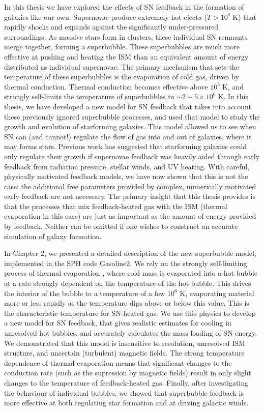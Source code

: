 In this thesis we have explored the effects of SN feedback in the formation of
galaxies like our own.  Supernovae produce extremely hot ejecta
($T>10^8\;\mathrm{K}$) that rapidly shocks and expands against the significantly
under-pressured surroundings.  As massive stars form in clusters, these
individual SN remnants merge together, forming a superbubble.  These
superbubbles are much more effective at pushing and heating the ISM than an
equivalent amount of energy distributed as individual supernovae.  The primary
mechanism that sets the temperature of these superbubbles is the evaporation of
cold gas, driven by thermal conduction.  Thermal conduction becomes effective
above $10^5\;\mathrm{K}$, and strongly self-limits the temperature of
superbubbles to $\sim2-5\times10^6\;\mathrm{K}$.  In this thesis, we have
developed a new model for SN feedback that takes into account these previously
ignored superbubble processes, and used that model to study the growth and
evolution of starforming galaxies.  This model allowed us to see when SN can
(and cannot!) regulate the flow of gas into and out of galaxies, where it may
forms stars.  Previous work \citep{Stinson2013,Hopkins2014} has suggested that
starforming galaxies could only regulate their growth if supernovae feedback was
heavily aided through early feedback from radiation pressure, stellar winds, and
UV heating.  With careful, physically motivated feedback models, we have now
shown that this is not the case:  the additional free parameters provided by
complex, numerically motivated early feedback are not necessary.  The primary
insight that this thesis provides is that the processes that mix feedback-heated
gas with the ISM (thermal evaporation in this case) are just as important as the
amount of energy provided by feedback.  Neither can be omitted if one wishes to
construct an accurate simulation of galaxy formation.  

In Chapter 2, we presented a detailed description of the new superbubble model,
implemented in the SPH code {\sc Gasoline2}.  We rely on the strongly
self-limiting process of thermal evaporation \citep{Cowie1977}, where cold mass
is evaporated into a hot bubble at a rate strongly dependent on the temperature
of the hot bubble. This drives the interior of the bubble to a temperature of a
few $10^6$ K, evaporating material more or less rapidly as the temperature dips
above or below this value.  This is the characteristic temperature for SN-heated
gas.  We use this physics to develop a new model for SN feedback, that gives
realistic estimates for cooling in unresolved hot bubbles, and accurately
calculates the mass loading of SN energy.  We demonstrated that this model is
insensitive to resolution, unresolved ISM structure, and uncertain (turbulent)
magnetic fields.  The strong temperature dependence of thermal evaporation means
that significant changes to the conduction rate (such as the supression by
magnetic fields) result in only slight changes to the temperature of
feedback-heated gas.  Finally, after investigating the behaviour of individual
bubbles, we showed that superbubble feedback is more effective at both
regulating star formation and at driving galactic winds.


